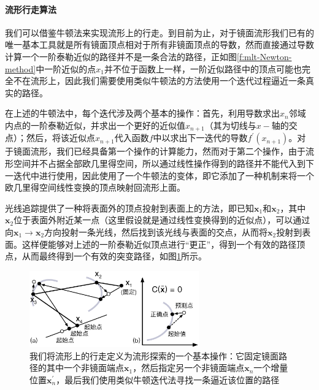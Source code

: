 \paragraph{流形行走算法}
我们可以借鉴牛顿法来实现流形上的行走。到目前为止，对于镜面流形我们已有的唯一基本工具就是所有镜面顶点相对于所有非镜面顶点的导数，然而直接通过导数计算一个一阶泰勒近似的路径并不是一条合法的路径，正如图\ref{f:mlt-Newton-method}中一阶近似的点$x_1$并不位于函数上一样，一阶近似路径中的顶点可能也完全不在流形上，因此我们需要使用类似牛顿法的方法使用一个迭代过程逼近一条真实的路径。

在上述的牛顿法中，每个迭代涉及两个基本的操作：首先，利用导数求出$x_n$邻域内点的一阶泰勒近似，并求出一个更好的近似值$x_{n+1}$（其为切线与$x-$轴的交点）；然后，将该近似点$x_{n+1}$代入函数$f$中以求出下一迭代的导数$f^{'}(x_{n+1})$。对于镜面流形，我们已经具备第一个操作的计算能力，然而对于第二个操作，由于流形空间并不占据全部欧几里得空间，所以通过线性操作得到的路径并不能代入到下一迭代中进行使用，因此\cite{a:ManifoldExplorationAMarkovChainMonteCarloTechniqueforRenderingSceneswithDifficultSpecularTransport}使用了一个牛顿法的变体，即它添加了一种机制来将一个欧几里得空间线性变换的顶点映射回流形上面。

光线追踪提供了一种将表面外的顶点投射到表面上的方法，即已知$\mathbf{x}_1$和$\mathbf{x}_2$，其中$\mathbf{x}_2$位于表面外附近某一点（这里假设就是通过线性变换得到的近似点），可以通过向$\mathbf{x}_1\to\mathbf{x}_2$方向投射一条光线，然后找到该光线与表面的交点，从而将$\mathbf{x}_2$投射到表面。这样便能够对上述的一阶泰勒近似顶点进行“更正”，得到一个有效的路径顶点，从而最终得到一个有效的突变路径，如图\ref{f:mlt-manifold-walk}所示。

\begin{figure}
	\sidecaption
	\includegraphics[width=0.65\textwidth]{figures/mlt/manifold-walk}
	\caption{我们将流形上的行走定义为流形探索的一个基本操作：它固定镜面路径的其中一个非镜面端点$\mathbf{x}_1$，然后指定另一个非镜面端点$\mathbf{x}_n$一个增量位置$\mathbf{x}^{'}_n$，最后我们使用类似牛顿迭代法寻找一条逼近该位置的路径}
	\label{f:mlt-manifold-walk}
\end{figure}

